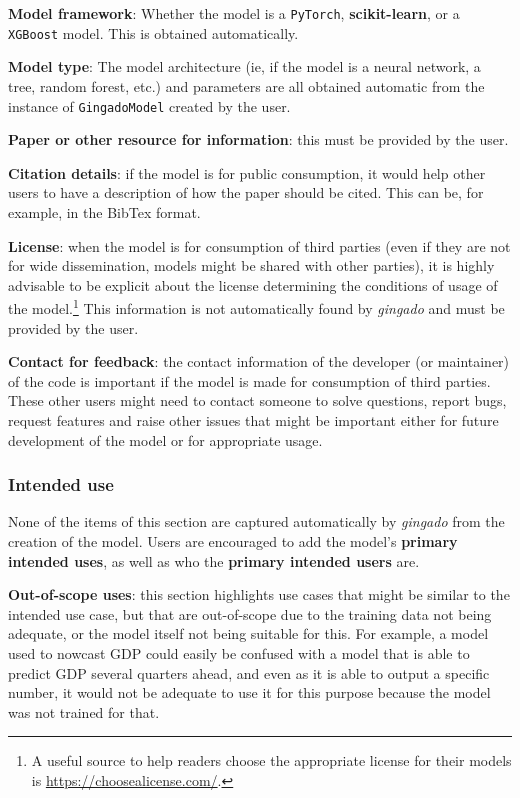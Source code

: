 \documentclass{article}
\begin{document}
\textbf{Model framework}: Whether the model is a \texttt{PyTorch}, \textbf{scikit-learn}, or a \texttt{XGBoost} model. This is obtained automatically.

\textbf{Model type}: The model architecture (ie, if the model is a neural network, a tree, random forest, etc.) and parameters are all obtained automatic from the instance of \texttt{GingadoModel} created by the user.

\textbf{Paper or other resource for information}: this must be provided by the user.

\textbf{Citation details}: if the model is for public consumption, it would help other users to have a description of how the paper should be cited. This can be, for example, in the BibTex format.

\textbf{License}: when the model is for consumption of third parties (even if they are not for wide dissemination, models might be shared with other parties), it is highly advisable to be explicit about the license determining the conditions of usage of the model.\footnote{A useful source to help readers choose the appropriate license for their models is \url{https://choosealicense.com/}.} This information is not automatically found by \textit{gingado} and must be provided by the user.

\textbf{Contact for feedback}: the contact information of the developer (or maintainer) of the code is important if the model is made for consumption of third parties. These other users might need to contact someone to solve questions, report bugs, request features and raise other issues that might be important either for future development of the model or for appropriate usage.

\subsubsection{Intended use}

None of the items of this section are captured automatically by \textit{gingado} from the creation of the model. Users are encouraged to add the model's \textbf{primary intended uses}, as well as who the \textbf{primary intended users} are.

\textbf{Out-of-scope uses}: this section highlights use cases that might be similar to the intended use case, but that are out-of-scope due to the training data not being adequate, or the model itself not being suitable for this. For example, a model used to nowcast GDP could easily be confused with a model that is able to predict GDP several quarters ahead, and even as it is able to output a specific number, it would not be adequate to use it for this purpose because the model was not trained for that.
\end{document}
